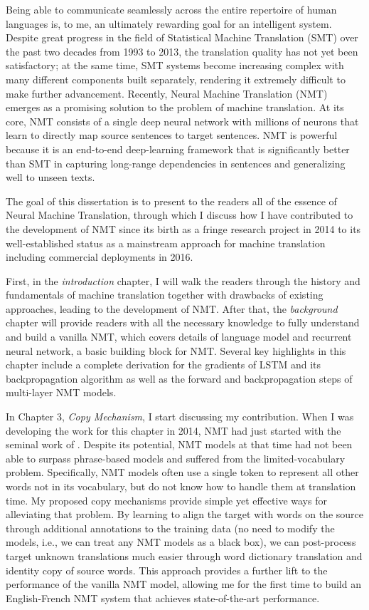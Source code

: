 Being able to communicate seamlessly across the entire repertoire of human languages is, to me, an ultimately rewarding goal for an intelligent system. Despite great progress in the field of Statistical Machine Translation (SMT) over the past two decades from 1993 to 2013, the translation quality has not yet been satisfactory; at the same time, SMT systems become increasing complex with many different components built separately, rendering it extremely difficult to make further advancement.
Recently, Neural Machine Translation (NMT) emerges as a promising solution to the problem of machine translation. At its core, NMT consists of a single deep neural network with millions of neurons that learn to directly map source sentences to target sentences. NMT is powerful because it is an end-to-end deep-learning framework that is significantly better than SMT in capturing long-range dependencies in sentences and generalizing well to unseen texts.

The goal of this dissertation is to present to the readers all of the essence of Neural Machine Translation, through which I discuss how I have contributed to the development of NMT since its birth as a fringe research project in 2014 to its well-established status as a mainstream approach for machine translation including commercial deployments in 2016. 

First, in the {\it introduction} chapter, I will walk the readers through the history and fundamentals of machine translation together with drawbacks of existing approaches, leading to the development of NMT. After that, the {\it background} chapter will provide readers with all the necessary knowledge to fully understand and build a vanilla NMT, which covers details of language model and recurrent neural network, a basic building block for NMT. Several key highlights in this chapter include a complete derivation for the gradients of LSTM and its backpropagation algorithm as well as the forward and backpropagation steps of multi-layer NMT models. 

In Chapter 3, {\it Copy Mechanism}, I start discussing my contribution. When I was developing the work for this chapter in 2014,
NMT had just started with the seminal work of . Despite its potential, NMT models at that time had not been able to surpass phrase-based models and suffered from the limited-vocabulary problem. Specifically, NMT models often use a single \unk{} token to represent all other words not in its vocabulary, but do not know how to handle them at translation time. My proposed copy mechanisms provide simple yet effective ways for alleviating that problem. By learning to align the target \unk{} with words on the source through additional annotations to the training data (no need to modify the models, i.e., we can treat any NMT models as a black box), we can post-process target unknown translations much easier through word dictionary translation and identity copy of source words. This approach provides a further lift to the performance of the vanilla NMT model, allowing me for the first time to build an English-French NMT system that achieves state-of-the-art performance.

